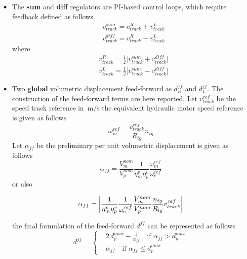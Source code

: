 \documentclass[11pt,a4paper,oneside]{book}
\begin{document}
\begin{onehalfspace}
\begin{itemize}
	\item The \textbf{sum} and \textbf{diff} regulators are PI-based control loops, which require feedback defined as follows
	\begin{equation}
		\begin{aligned}
			& v_{track}^{sum} = v_{track}^{R} + v_{track}^{L} \\[6pt]
			& v_{track}^{diff} = v_{track}^{R} - v_{track}^{L}
		\end{aligned}
	\end{equation}
	where 
	\begin{equation}
		\begin{aligned}
			& v_{track}^{R} = \frac{1}{2}\Big[v_{track}^{sum} + v_{track}^{diff}\Big] \\[6pt]
			& v_{track}^{L} = \frac{1}{2}\Big[v_{track}^{sum} - v_{track}^{diff}\Big]
		\end{aligned}
	\end{equation}
	\item Two \textbf{global} volumetric displacement feed-forward as $d_R^{ff}$ and $d_L^{ff}$. The construction of the feed-forward terms are here reported. Let $v_{track}^{ref}$ be the speed track reference in $\SI{}{\meter\per\second}$ the equivalent hydraulic motor speed reference is given as follows
	\begin{equation}
		\omega_m^{ref} =\frac{v_{track}^{ref}}{R_{tg}}n_{tg}
	\end{equation}
	Let $\alpha_{ff}$ be the preliminary per unit volumetric displacement is given as follows
	\begin{equation}
		\alpha_{ff} =\frac{V_m^{nom}}{V_p^{nom}} \frac{1}{\eta_m^v\eta_p^v} \frac{\omega_m^{ref}}{\omega_e^{ref}}
	\end{equation}
	or also
	\begin{mybox}
		\begin{equation}
			\alpha_{ff} = \abs{\frac{1}{\eta_m^v\eta_p^v}\frac{1}{\omega_e^{ref}}\frac{V_m^{nom}}{V_p^{nom}} \frac{n_{tg}}{R_{tg}}v_{track}^{ref}}
		\end{equation}
	\end{mybox}
	the final formulation of the feed-forward $d^{ff}$ can be represented as follows
	\begin{equation}
		\boxed{d^{ff} = \left\lbrace \begin{aligned}
				& 2\,d_p^{max} - \frac{1}{\alpha_{ff}} \quad\text{if $\alpha_{ff} > d_p^{max}$} \\[6pt]
				& \alpha_{ff}  \quad\text{if $\alpha_{ff} \le d_p^{max}$}
			\end{aligned}\right. }
	\end{equation}
\end{itemize}


\end{onehalfspace}
\end{document}
